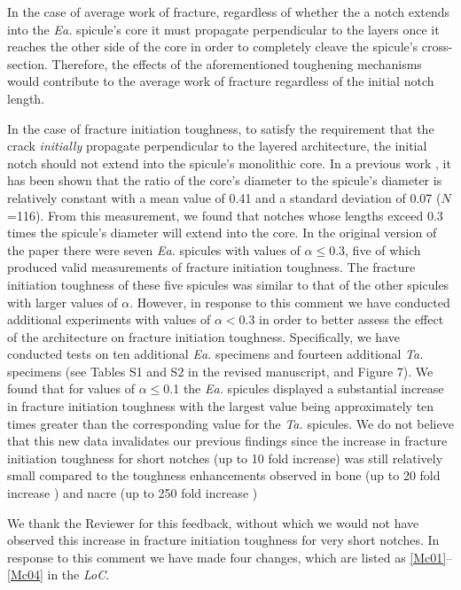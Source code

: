 \documentclass[11pt,letterpaper]{report}
\makeatletter
\newcommand{\TA}{\textit{Ta.\@}\xspace}
\newcommand{\EA}{\textit{Ea.\@}\xspace}
\makeatother
\begin{document}
\begin{enumerate}[label=\textit{1.\arabic*},wide, labelwidth=!, labelindent=0pt]
In the case of average work of fracture, regardless of whether the a notch extends into the \EA spicule's core it must propagate perpendicular to the layers once it reaches the other side of the core in order to completely cleave the spicule's cross-section. Therefore, the effects of the aforementioned toughening mechanisms would contribute to the average work of fracture regardless of the initial notch length. 

In the case of fracture initiation toughness, to satisfy the requirement that the crack \emph{initially} propagate perpendicular to the layered architecture, the initial notch should not extend into the spicule's monolithic core. In a previous work \cite{monn2015new}, it has been shown that the ratio of the core's diameter to the spicule's diameter is relatively constant with a mean value of 0.41 and a standard deviation of 0.07 ($N$=116). From this measurement, we found that notches whose lengths exceed 0.3 times the spicule's diameter will extend into the core. In the original version of the paper there were seven \EA spicules with values of $\alpha\leq$0.3, five of which produced valid measurements of fracture initiation toughness. The fracture initiation toughness of these five spicules was similar to that of the other spicules with larger values of $\alpha$. However, in response to this comment we have conducted additional experiments with values of $\alpha<$0.3 in order to better assess the effect of the architecture on fracture initiation toughness. Specifically, we have conducted tests on ten additional \EA specimens and fourteen additional \TA specimens (see Tables S1 and S2 in the revised manuscript, and Figure 7). We found that for values of $\alpha\leq$0.1 the \EA spicules displayed a substantial increase in fracture initiation toughness with the largest value being approximately ten times greater than the corresponding value for the \TA spicules. We do not believe that this new data invalidates our previous findings since the increase in fracture initiation toughness for short notches (up to 10 fold increase) was still relatively small compared to the toughness enhancements observed in bone (up to 20 fold increase \cite{nalla2005mechanistic}) and nacre (up to 250 fold increase \cite{jackson1988mechanical})

We thank the Reviewer for this feedback, without which we would not have observed this increase in fracture initiation toughness for very short notches. In response to this comment we have made four changes, which are listed as \ref{Mc01}--\ref{Mc04} in the \textit{LoC}.


\end{enumerate}
\end{document}
